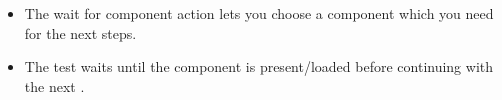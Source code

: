 
\begin{itemize}
\item The wait for component action lets you choose a component which you need for the next steps.
\item The test waits until the component is present/loaded before continuing with the next \gdstep{}.
\end{itemize}
